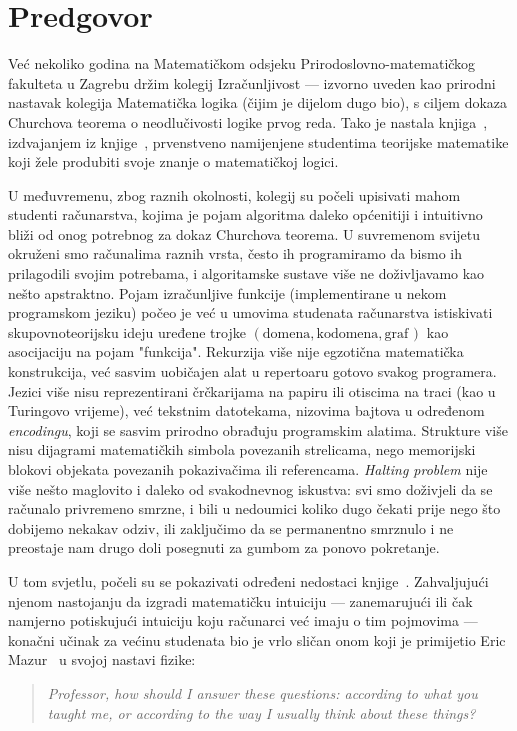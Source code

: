 \chapter[]{Predgovor}


Već nekoliko godina na Matematičkom odsjeku Prirodoslovno-matematičkog fakulteta u Zagrebu držim kolegij Izračunljivost --- izvorno uveden kao prirodni nastavak kolegija Matematička logika (čijim je dijelom dugo bio), s ciljem dokaza Churchova teorema o neodlučivosti logike prvog reda. Tako je nastala knjiga~\cite{skr:Vuk}, izdvajanjem iz knjige~\cite{skr:VukML}, prvenstveno namijenjene studentima teorijske matematike koji žele produbiti svoje znanje o matematičkoj logici.

U međuvremenu, zbog raznih okolnosti, kolegij su počeli upisivati mahom studenti računarstva, kojima je pojam algoritma daleko općenitiji i intuitivno bliži od onog potrebnog za dokaz Churchova teorema. U suvremenom svijetu okruženi smo računalima raznih vrsta, često ih programiramo da bismo ih prilagodili svojim potrebama, i algoritamske sustave više ne doživljavamo kao nešto apstraktno. Pojam izračunljive funkcije (implementirane u nekom programskom jeziku) počeo je već u umovima studenata računarstva istiskivati skupovnoteorijsku ideju uređene trojke $(\text{domena},\text{kodomena},\text{graf}\mspace{2mu})$ kao asocijaciju na pojam "funkcija". Rekurzija više nije egzotična matematička konstrukcija, već sasvim uobičajen alat u repertoaru gotovo svakog programera. Jezici više nisu reprezentirani črčkarijama na papiru ili otiscima na traci (kao u Turingovo vrijeme), već tekstnim datotekama, nizovima bajtova u određenom \emph{encodingu}, koji se sasvim prirodno obrađuju programskim alatima. Strukture više nisu dijagrami matematičkih simbola povezanih strelicama, nego memorijski blokovi objekata povezanih pokazivačima ili referencama. \emph{Halting problem} nije više nešto maglovito i daleko od svakodnevnog iskustva: svi smo doživjeli da se računalo privremeno smrzne, i bili u nedoumici koliko dugo čekati prije nego što dobijemo nekakav odziv\!, ili zaključimo da se permanentno smrznulo i ne preostaje nam drugo doli posegnuti za gumbom za ponovo pokretanje. 

U tom svjetlu, počeli su se pokazivati određeni nedostaci knjige~\cite{skr:Vuk}. Zahvaljujući njenom nastojanju da izgradi matematičku intuiciju --- zanemarujući ili čak namjerno potiskujući intuiciju koju računarci već imaju o tim pojmovima --- konačni učinak za većinu studenata bio je vrlo sličan onom koji je primijetio Eric Mazur~\cite{mazur} u svojoj nastavi fizike:
\begin{quote}
    \emph{Professor, how should I answer these questions: according to what you \\ taught me, or according to the way I usually think about these things?}
\end{quote}

